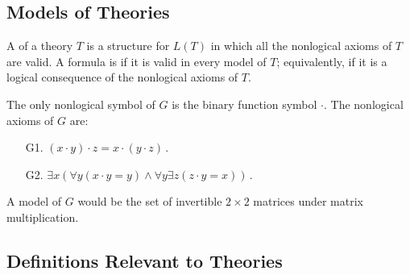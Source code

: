 
\subsection{Models of Theories}

\begin{definition}[Model]
	A  of a theory $T$ is a structure 
	for $L(T)$ in which all the nonlogical axioms of $T$ are valid. 
	A formula is  if it is valid in every model of 
	$T$; equivalently, if it is a logical consequence of the 
	nonlogical axioms of $T$.
\end{definition}

\begin{example}
	The only nonlogical symbol of $G$ is the binary function symbol 
	$\cdot$. The nonlogical axioms of $G$ are:
	\begin{enumerate}
		\item[G1.] $(x \cdot y) \cdot z = x \cdot (y \cdot z)$\,.
		
		\item[G2.] $\exists x (\forall y(x \cdot y = y) \land 
		\forall y \exists z (z \cdot y = x))$\,.
	\end{enumerate}
	
	A model of $G$ would be the set of invertible $2 \times 2$ 
	matrices under matrix multiplication.
\end{example}


\subsection{Definitions Relevant to Theories}

